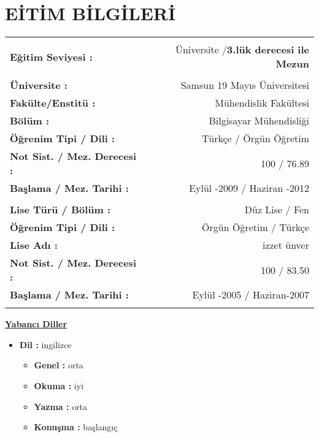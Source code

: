 \documentclass[10pt,a4paper]{article}
\begin{document}
\section{\sc E{\footnotesize İT\footnotesize İM} B{\footnotesize İLG\footnotesize İLER\footnotesize İ}}
\hspace*{1.6in}\begin{tabular}{lr}
\vspace{0.5 mm}\\
\textbf{Eğitim Seviyesi :} & Üniversite /\textbf{3.lük derecesi ile Mezun} \\
\vspace{0.5 mm}\\
\textbf{Üniversite :} & Samsun 19 Mayıs Üniversitesi \\
\textbf{Fakülte/Enstitü :} & Mühendislik Fakültesi \\
\textbf{Bölüm :} & Bilgisayar Mühendisliği \\
\textbf{Öğrenim Tipi / Dili :} & Türkçe / Örgün Öğretim\\
\textbf{Not Sist. / Mez. Derecesi :} & 100 / 76.89 \\
\textbf{Başlama / Mez. Tarihi :} & Eylül -2009 / Haziran -2012\\
\vspace{0.5 mm}\\
\textbf{Lise Türü / Bölüm :} & Düz Lise / Fen\\
\textbf{Öğrenim Tipi / Dili :} & Örgün Öğretim / Türkçe\\
\textbf{Lise Adı :} & izzet ünver\\
\textbf{Not Sist. / Mez. Derecesi :} & 100 / 83.50\\
\textbf{Başlama / Mez. Tarihi :} & Eylül -2005 / Haziran-2007\\
\vspace{0.5 mm}\\
\end{tabular}

\underline{\textbf{Yabancı Diller}}
\vspace{0.5 mm}\\
\begin{itemize}
	\item{\textbf{Dil :} ingilizce}
	\begin{itemize}
		\item{\textbf{Genel :} orta}
		\item{\textbf{Okuma :} iyi}
		\item{\textbf{Yazma :} orta}
		\item{\textbf{Konuşma :} başlangıç}
	\end{itemize}		
\end{itemize}
\end{document}
